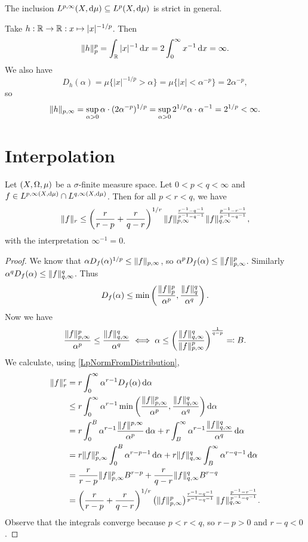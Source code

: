 \begin{example}
The inclusion $L^{p,\infty}(X,\operatorname{d \!}{\mu}) \subseteq L^{p}(X,\operatorname{d \!}{\mu})$ is strict in general.

Take $h: \mathbb{R}\to \mathbb{R}: x\mapsto |x|^{-1/p}$. Then
\[ \lVert h\rVert_p^p = \int_{\mathbb{R}} |x|^{-1} \operatorname{d \!}{x} = 2\int_0^\infty x^{-1}\operatorname{d \!}{x} = \infty. \]
We also have
\[ D_h(\alpha) = \mu\big\{|x|^{-1/p} > \alpha\big\} = \mu\big\{|x| < \alpha^{-p}\big\} = 2\alpha^{-p}, \]
so
\[ \lVert h\rVert_{p,\infty} = \sup_{\alpha > 0}\alpha\cdot (2\alpha^{-p})^{1/p} = \sup_{\alpha > 0}2^{1/p}\alpha\cdot \alpha^{-1} = 2^{1/p} < \infty. \]
\end{example}

\section{Interpolation}

\begin{proposition}
Let $\sSet{X,\Omega, \mu}$ be a $\sigma$-finite measure space.
Let $0<p<q<\infty$ and $f\in L^{p,\infty(X,\operatorname{d \!}{\mu})} \cap L^{q,\infty(X,\operatorname{d \!}{\mu})}$. Then for all $p<r<q$, we have
\[ \lVert f\rVert_r \leq \left(\frac{r}{r-p} + \frac{r}{q-r}\right)^{1/r}\lVert f\rVert_{p,\infty}^{\frac{r^{-1}- q^{-1}}{p^{-1} - q^{-1}}}\lVert f\rVert_{q,\infty}^{\frac{p^{-1}- r^{-1}}{p^{-1} - q^{-1}}}, \]
with the interpretation $\infty^{-1} = 0$.
\end{proposition}
\begin{proof}
We know that $\alpha D_f(\alpha)^{1/p} \leq \lVert f\rVert_{p,\infty}$, so $\alpha^p D_f(\alpha) \leq \lVert f\rVert_{p,\infty}^p$. Similarly $\alpha^q D_f(\alpha) \leq \lVert f\rVert_{q,\infty}^q$. Thus
\[ D_f(\alpha) \leq \min\left(\frac{\lVert f\rVert^p_p}{\alpha^p}, \frac{\lVert f\rVert^q_q}{\alpha^q}\right). \]
Now we have
\[ \frac{\lVert f\rVert^p_{p,\infty}}{\alpha^p} \leq \frac{\lVert f\rVert^q_{q,\infty}}{\alpha^q} \iff \alpha \leq \left(\frac{\lVert f\rVert_{q,\infty}^q}{\lVert f\rVert_{p,\infty}^p}\right)^{\frac{1}{q-p}} \eqqcolon B. \]
We calculate, using \ref{LpNormFromDistribution},
\begin{align*}
\lVert f\rVert_r^r &= r \int_0^\infty\alpha^{r-1}D_f(\alpha)\operatorname{d \!}{\alpha} \\
&\leq r \int_0^\infty\alpha^{r-1}\min\left(\frac{\lVert f\rVert^p_{p,\infty}}{\alpha^p}, \frac{\lVert f\rVert^q_{q,\infty}}{\alpha^q}\right)\operatorname{d \!}{\alpha} \\
&= r \int_0^B\alpha^{r-1}\frac{\lVert f\rVert^{p,\infty}}{\alpha^p}\operatorname{d \!}{\alpha} + r \int_B^\infty\alpha^{r-1}\frac{\lVert f\rVert^q_{q,\infty}}{\alpha^q}\operatorname{d \!}{\alpha} \\
&= r \lVert f\rVert^p_{p,\infty} \int_0^B\alpha^{r-p-1}\operatorname{d \!}{\alpha} + r \lVert f\rVert^q_{q,\infty} \int_B^\infty\alpha^{r-q-1}\operatorname{d \!}{\alpha} \\
&= \frac{r}{r-p} \lVert f\rVert^p_{p,\infty} B^{r-p} + \frac{r}{q-r} \lVert f\rVert^q_{q,\infty} B^{r-q} \\
&= \left(\frac{r}{r-p} + \frac{r}{q-r}\right)^{1/r}\left(\lVert f\rVert_{p,\infty}^p\right)^{\frac{r^{-1}- q^{-1}}{p^{-1} - q^{-1}}}\lVert f\rVert_{q,\infty}^{\frac{p^{-1}- r^{-1}}{p^{-1} - q^{-1}}}.
\end{align*}
Observe that the integrals converge because $p<r<q$, so $r-p>0$ and $r-q<0$.
\end{proof}

